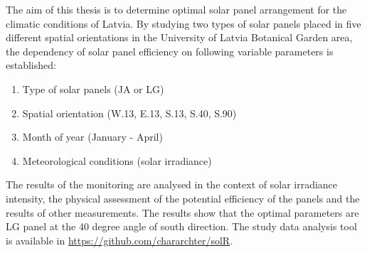 The aim of this thesis is to determine optimal solar panel arrangement for the climatic conditions of Latvia.
By studying two types of solar panels placed in five different spatial orientations in the University of Latvia Botanical Garden area, the dependency of solar panel efficiency on following variable parameters is established:
\begin{enumerate}
\item Type of solar panels (JA or LG)
\item Spatial orientation (W.13, E.13, S.13, S.40, S.90)
\item Month of year (January - April)
\item Meteorological conditions (solar irradiance)
\end{enumerate}

The results of the monitoring are analysed in the context of solar irradiance intensity, the physical assessment of the potential efficiency of the panels and the results of other measurements.
The results show that the optimal parameters are LG panel at the 40 degree angle of south direction. The study data analysis tool is available in \url{https://github.com/chararchter/solR}.

